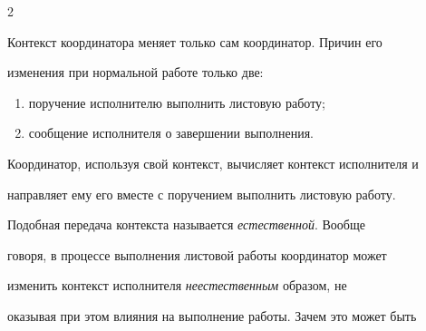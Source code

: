 \begin{multicols}{2}





Контекст координатора меняет только сам координатор. Причин его 


изменения при нормальной работе только две:


\begin{enumerate}[(1)]


\item поручение исполнителю выполнить листовую работу;


\item сообщение исполнителя о завершении выполнения.


\end{enumerate}





Координатор, используя свой контекст, вы\-чис\-ля\-ет контекст исполнителя и 


направляет ему его вместе с поручением выполнить листовую работу. 


Подобная передача контекста называется \textit{естественной}. Вообще 


говоря, в процессе выполнения листовой работы координатор может 


изменить контекст исполнителя \textit{неестественным} образом, не 


оказывая при этом влияния на выполнение работы. Зачем это может быть 



\end{multicols}
